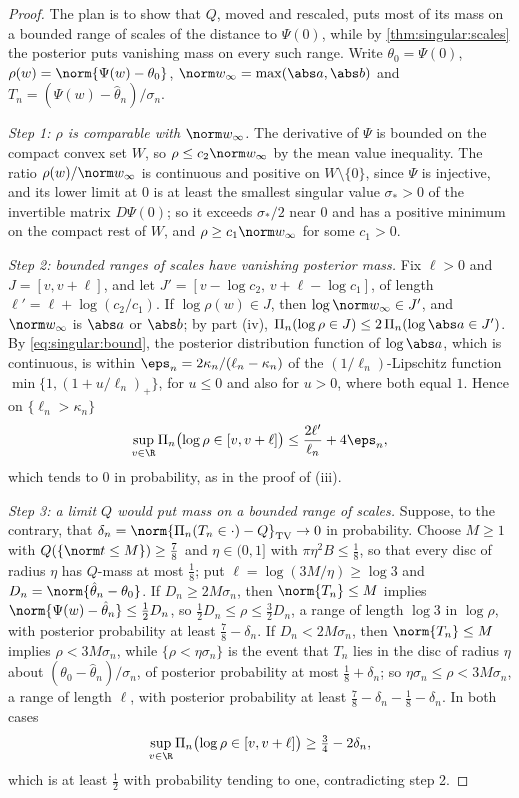 \begin{refsection}
\begin{proof}
The plan is to show that $Q$, moved and rescaled, puts most of its mass on a bounded range of scales of the distance to $\Psi(0)$, while by \cref{thm:singular:scales} the posterior puts vanishing mass on every such range. Write $\theta_0=\Psi(0)$, $\rho(w)=\norm{\Psi(w)-\theta_0}$, $\norm w_\infty=\max(\abs a,\abs b)$ and $T_n=(\Psi(w)-\hat\theta_n)/\sigma_n$.

\emph{Step 1: $\rho$ is comparable with $\norm w_\infty$.} The derivative of $\Psi$ is bounded on the compact convex set $W$, so $\rho\le c_2\norm w_\infty$ by the mean value inequality. The ratio $\rho(w)/\norm w_\infty$ is continuous and positive on $W\setminus\{0\}$, since $\Psi$ is injective, and its lower limit at $0$ is at least the smallest singular value $\sigma_*>0$ of the invertible matrix $D\Psi(0)$; so it exceeds $\sigma_*/2$ near $0$ and has a positive minimum on the compact rest of $W$, and $\rho\ge c_1\norm w_\infty$ for some $c_1>0$.

\emph{Step 2: bounded ranges of scales have vanishing posterior mass.} Fix $\ell>0$ and $J=[v,v+\ell]$, and let $J'=[v-\log c_2,\,v+\ell-\log c_1]$, of length $\ell'=\ell+\log(c_2/c_1)$. If $\log\rho(w)\in J$, then $\log\norm w_\infty\in J'$, and $\norm w_\infty$ is $\abs a$ or $\abs b$; by part (iv), $\Pi_n(\log\rho\in J)\le2\,\Pi_n(\log\abs a\in J')$. By \eqref{eq:singular:bound}, the posterior distribution function of $\log\abs a$, which is continuous, is within $\eps_n=2\kappa_n/(\ell_n-\kappa_n)$ of the $(1/\ell_n)$-Lipschitz function $\min\{1,(1+u/\ell_n)_+\}$, for $u\le0$ and also for $u>0$, where both equal $1$. Hence on $\{\ell_n>\kappa_n\}$
\[
\sup_{v\in\R}\Pi_n\bigl(\log\rho\in[v,v+\ell]\bigr)\le\frac{2\ell'}{\ell_n}+4\eps_n,
\]
which tends to $0$ in probability, as in the proof of (iii).

\emph{Step 3: a limit $Q$ would put mass on a bounded range of scales.} Suppose, to the contrary, that $\delta_n=\norm{\Pi_n(T_n\in\cdot)-Q}_{\mathrm{TV}}\to0$ in probability. Choose $M\ge1$ with $Q(\{\norm t\le M\})\ge\frac78$ and $\eta\in(0,1]$ with $\pi\eta^2B\le\frac18$, so that every disc of radius $\eta$ has $Q$-mass at most $\frac18$; put $\ell=\log(3M/\eta)\ge\log3$ and $D_n=\norm{\hat\theta_n-\theta_0}$. If $D_n\ge2M\sigma_n$, then $\norm{T_n}\le M$ implies $\norm{\Psi(w)-\hat\theta_n}\le\frac12D_n$, so $\frac12D_n\le\rho\le\frac32D_n$, a range of length $\log3$ in $\log\rho$, with posterior probability at least $\frac78-\delta_n$. If $D_n<2M\sigma_n$, then $\norm{T_n}\le M$ implies $\rho<3M\sigma_n$, while $\{\rho<\eta\sigma_n\}$ is the event that $T_n$ lies in the disc of radius $\eta$ about $(\theta_0-\hat\theta_n)/\sigma_n$, of posterior probability at most $\frac18+\delta_n$; so $\eta\sigma_n\le\rho<3M\sigma_n$, a range of length $\ell$, with posterior probability at least $\frac78-\delta_n-\frac18-\delta_n$. In both cases
\[
\sup_{v\in\R}\Pi_n\bigl(\log\rho\in[v,v+\ell]\bigr)\ge\tfrac34-2\delta_n,
\]
which is at least $\frac12$ with probability tending to one, contradicting step 2.
\end{proof}


\end{refsection}
